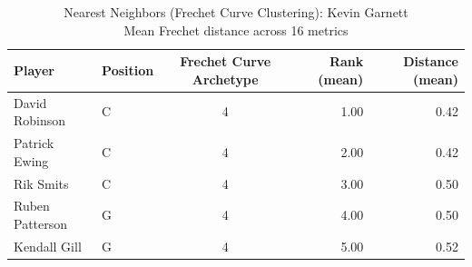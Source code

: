 \begin{table}[t]
\caption*{
{\fontsize{20}{25} Nearest Neighbors (Frechet Curve Clustering): Kevin Garnett\fontsize{12}{15}\selectfont } \\ 
{\fontsize{14}{17}\selectfont  Mean Frechet distance across 16 metrics\fontsize{12}{15}\selectfont }
} 
\fontsize{12.0pt}{14.0pt}\selectfont
\begin{tabular*}{\linewidth}{@{\extracolsep{\fill}}llcrr}
\toprule
Player & Position & Frechet Curve Archetype & Rank (mean) & Distance (mean) \\ 
\midrule\addlinespace[2.5pt]
David Robinson & C & 4 & 1.00 & 0.42 \\ 
Patrick Ewing & C & 4 & 2.00 & 0.42 \\ 
Rik Smits & C & 4 & 3.00 & 0.50 \\ 
Ruben Patterson & G & 4 & 4.00 & 0.50 \\ 
Kendall Gill & G & 4 & 5.00 & 0.52 \\ 
\bottomrule
\end{tabular*}
\end{table}

